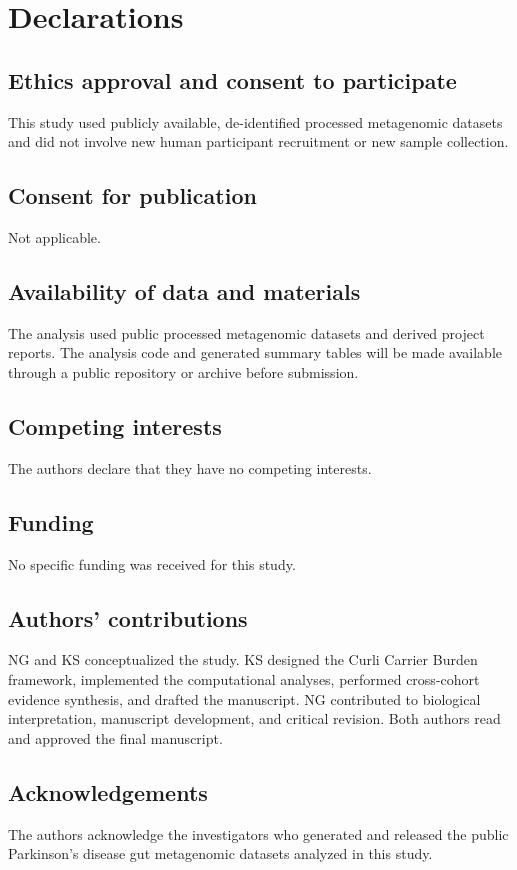 \documentclass[12pt]{article}
\begin{document}
\section*{Declarations}
\subsection*{Ethics approval and consent to participate}
This study used publicly available, de-identified processed metagenomic datasets and did not involve new human participant recruitment or new sample collection.

\subsection*{Consent for publication}
Not applicable.

\subsection*{Availability of data and materials}
The analysis used public processed metagenomic datasets and derived project reports. The analysis code and generated summary tables will be made available through a public repository or archive before submission.

\subsection*{Competing interests}
The authors declare that they have no competing interests.

\subsection*{Funding}
No specific funding was received for this study.

\subsection*{Authors' contributions}
NG and KS conceptualized the study. KS designed the Curli Carrier Burden framework, implemented the computational analyses, performed cross-cohort evidence synthesis, and drafted the manuscript. NG contributed to biological interpretation, manuscript development, and critical revision. Both authors read and approved the final manuscript.

\subsection*{Acknowledgements}
The authors acknowledge the investigators who generated and released the public Parkinson's disease gut metagenomic datasets analyzed in this study.
\end{document}
